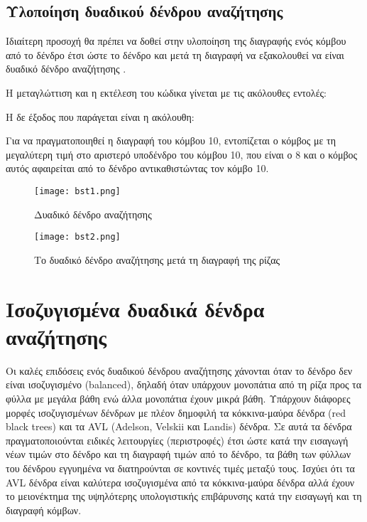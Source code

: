 \subsection{Υλοποίηση δυαδικού δένδρου αναζήτησης}

Ιδιαίτερη προσοχή θα πρέπει να δοθεί στην υλοποίηση της διαγραφής ενός κόμβου από το δένδρο έτσι ώστε το δένδρο και μετά τη διαγραφή να εξακολουθεί να είναι δυαδικό δένδρο αναζήτησης \cite{jumping_into_cpp}. 







Η μεταγλώττιση και η εκτέλεση του κώδικα γίνεται με τις ακόλουθες εντολές:



Η δε έξοδος που παράγεται είναι η ακόλουθη:



Για να πραγματοποιηθεί η διαγραφή του κόμβου 10, εντοπίζεται ο κόμβος με τη μεγαλύτερη τιμή στο αριστερό υποδένδρο του κόμβου 10, που είναι ο 8 και ο κόμβος αυτός αφαιρείται από το δένδρο αντικαθιστώντας τον κόμβο 10.

\begin{figure}[!tbp]
  \centering
  \begin{minipage}[b]{0.4\textwidth}
    \texttt{[image: bst1.png]}
    \label{fig:bst1}
    \caption{Δυαδικό δένδρο αναζήτησης}
  \end{minipage}
  \hfill
  \begin{minipage}[b]{0.4\textwidth}
    \texttt{[image: bst2.png]}
    \label{fig:bst2}
    \caption{Το δυαδικό δένδρο αναζήτησης μετά τη διαγραφή της ρίζας}
  \end{minipage}
\end{figure}

\section{Ισοζυγισμένα δυαδικά δένδρα αναζήτησης}
\label{bbst}

Οι καλές επιδόσεις ενός δυαδικού δένδρου αναζήτησης χάνονται όταν το δένδρο δεν είναι ισοζυγισμένο (balanced), δηλαδή όταν υπάρχουν μονοπάτια από τη ρίζα προς τα φύλλα με μεγάλα βάθη ενώ άλλα μονοπάτια έχουν μικρά βάθη. Υπάρχουν διάφορες μορφές ισοζυγισμένων δένδρων με πλέον δημοφιλή τα κόκκινα-μαύρα δένδρα (red black trees) και τα AVL (Adelson, Velskii και Landis) δένδρα. Σε αυτά τα δένδρα πραγματοποιούνται ειδικές λειτουργίες (περιστροφές) έτσι ώστε κατά την εισαγωγή νέων τιμών στο δένδρο και τη διαγραφή τιμών από το δένδρο, τα βάθη των φύλλων του δένδρου εγγυημένα να διατηρούνται σε κοντινές τιμές μεταξύ τους. Ισχύει ότι τα AVL δένδρα είναι καλύτερα ισοζυγισμένα από τα κόκκινα-μαύρα δένδρα αλλά έχουν το μειονέκτημα της υψηλότερης υπολογιστικής επιβάρυνσης κατά την εισαγωγή και τη διαγραφή κόμβων.

